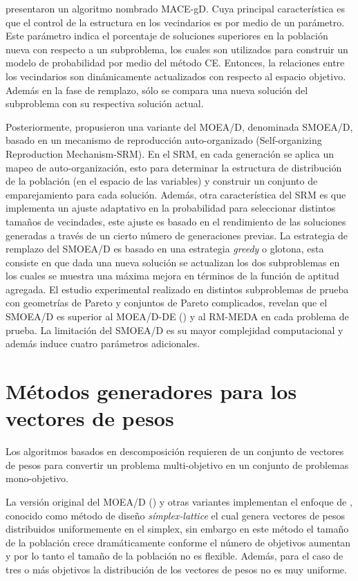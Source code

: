 \cite{giagkiozis2014generalized} presentaron un algoritmo nombrado MACE-gD.
%
Cuya principal característica es que el control de la estructura en los vecindarios es por medio de un parámetro.
%
Este parámetro indica el porcentaje de soluciones superiores en la población nueva con respecto a un subproblema, los cuales son utilizados para construir un modelo de probabilidad por medio del método CE.
%
Entonces, la relaciones entre los vecindarios son dinámicamente actualizados con respecto al espacio objetivo.
%
Además en la fase de remplazo, sólo se compara una nueva solución del subproblema con su respectiva solución actual.


Posteriormente, \cite{zhang2016self} propusieron una variante del MOEA/D, denominada SMOEA/D, basado en un mecanismo de reproducción auto-organizado (Self-organizing Reproduction Mechanism-SRM).
%
En el SRM, en cada generación se aplica un mapeo de auto-organización, esto para determinar la estructura de distribución de la población (en el espacio de las variables) y construir un conjunto de emparejamiento para cada solución.
%
Además, otra característica del SRM es que implementa un ajuste adaptativo en la probabilidad para seleccionar distintos tamaños de vecindades, este ajuste es basado en el rendimiento de las soluciones generadas a través de un cierto número de generaciones previas.
%
La estrategia de remplazo del SMOEA/D es basado en una estrategia \textit{greedy} o glotona, esta consiste en que dada una nueva solución se actualizan los dos subproblemas en los cuales se muestra una máxima mejora en términos de la función de aptitud agregada.
%
El estudio experimental realizado en distintos subproblemas de prueba con geometrías de Pareto y conjuntos de Pareto complicados, revelan que el SMOEA/D es superior al MOEA/D-DE (\cite{li2009multiobjective}) y al RM-MEDA en cada problema de prueba.
%
La limitación del SMOEA/D es su mayor complejidad computacional y además induce cuatro parámetros adicionales.



\section{Métodos generadores para los vectores de pesos}

Los algoritmos basados en descomposición requieren de un conjunto de vectores de pesos para convertir un problema multi-objetivo en un conjunto de problemas mono-objetivo.
%

La versión original del MOEA/D (\cite{Joel:MOEAD}) y otras variantes implementan el enfoque de \cite{das1998normal}, conocido como método de diseño \textit{símplex-lattice} el cual genera vectores de pesos distribuidos uniformemente en el simplex, sin embargo en este método el tamaño de la población crece dramáticamente conforme el número de objetivos aumentan y por lo tanto el tamaño de la población no es flexible.
%
Además, para el caso de tres o más objetivos la distribución de los vectores de pesos no es muy uniforme.
%


